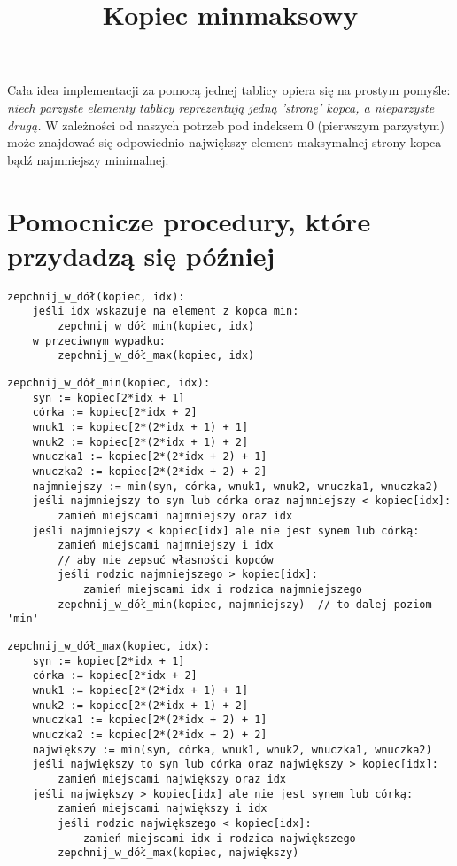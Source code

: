 \documentclass[11pt]{article}
\title{Kopiec minmaksowy}
\date{}
\begin{document}
\maketitle

Cała idea implementacji za pomocą jednej tablicy opiera się na prostym pomyśle:
\emph{niech parzyste elementy tablicy reprezentują jedną 'stronę' kopca, a nieparzyste drugą.}
W zależności od naszych potrzeb pod indeksem 0 (pierwszym parzystym) może znajdować
się odpowiednio największy element maksymalnej strony kopca bądź najmniejszy minimalnej.

\section{Pomocnicze procedury, które przydadzą się później}
\label{sec:orgdf495d5}

\begin{verbatim}
zepchnij_w_dół(kopiec, idx):
    jeśli idx wskazuje na element z kopca min:
        zepchnij_w_dół_min(kopiec, idx)
    w przeciwnym wypadku:
        zepchnij_w_dół_max(kopiec, idx)
\end{verbatim}

\begin{verbatim}
zepchnij_w_dół_min(kopiec, idx):
    syn := kopiec[2*idx + 1]
    córka := kopiec[2*idx + 2]
    wnuk1 := kopiec[2*(2*idx + 1) + 1]
    wnuk2 := kopiec[2*(2*idx + 1) + 2]
    wnuczka1 := kopiec[2*(2*idx + 2) + 1]
    wnuczka2 := kopiec[2*(2*idx + 2) + 2]
    najmniejszy := min(syn, córka, wnuk1, wnuk2, wnuczka1, wnuczka2)
    jeśli najmniejszy to syn lub córka oraz najmniejszy < kopiec[idx]:
        zamień miejscami najmniejszy oraz idx
    jeśli najmniejszy < kopiec[idx] ale nie jest synem lub córką:
        zamień miejscami najmniejszy i idx
        // aby nie zepsuć własności kopców
        jeśli rodzic najmniejszego > kopiec[idx]:
            zamień miejscami idx i rodzica najmniejszego
        zepchnij_w_dół_min(kopiec, najmniejszy)  // to dalej poziom 'min'
\end{verbatim}

\begin{verbatim}
zepchnij_w_dół_max(kopiec, idx):
    syn := kopiec[2*idx + 1]
    córka := kopiec[2*idx + 2]
    wnuk1 := kopiec[2*(2*idx + 1) + 1]
    wnuk2 := kopiec[2*(2*idx + 1) + 2]
    wnuczka1 := kopiec[2*(2*idx + 2) + 1]
    wnuczka2 := kopiec[2*(2*idx + 2) + 2]
    największy := min(syn, córka, wnuk1, wnuk2, wnuczka1, wnuczka2)
    jeśli największy to syn lub córka oraz największy > kopiec[idx]:
        zamień miejscami największy oraz idx
    jeśli największy > kopiec[idx] ale nie jest synem lub córką:
        zamień miejscami największy i idx
        jeśli rodzic największego < kopiec[idx]:
            zamień miejscami idx i rodzica największego
        zepchnij_w_dół_max(kopiec, największy)
\end{verbatim}
\end{document}
